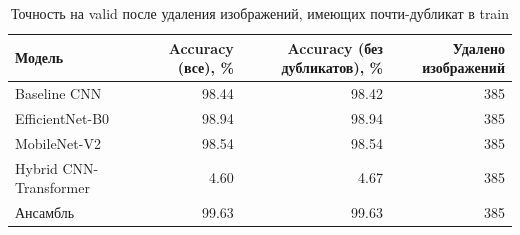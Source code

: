 \begin{table}[htbp]
\centering
\caption{Точность на valid после удаления изображений, имеющих почти-дубликат в train}
\label{tab:dedup}
\begin{tabular}{lrrr}
\toprule
Модель & Accuracy (все), \% & Accuracy (без дубликатов), \% & Удалено изображений \\
\midrule
Baseline CNN & 98.44 & 98.42 & 385 \\
EfficientNet-B0 & 98.94 & 98.94 & 385 \\
MobileNet-V2 & 98.54 & 98.54 & 385 \\
Hybrid CNN-Transformer & 4.60 & 4.67 & 385 \\
Ансамбль & 99.63 & 99.63 & 385 \\
\bottomrule
\end{tabular}
\end{table}
